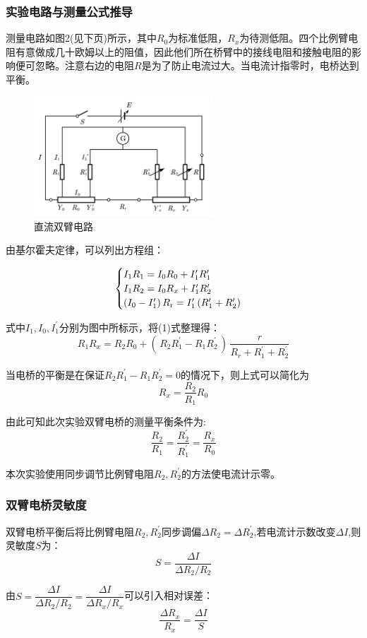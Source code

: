\documentclass[12pt,a4paper,UTF8]{ctexart}
\begin{document}
	\subsubsection*{实验电路与测量公式推导}
	\par 测量电路如图2(见下页)所示，其中$R_0$为标准低阻，$R_x$为待测低阻。四个比例臂电阻有意做成几十欧姆以上的阻值，因此他们所在桥臂中的接线电阻和接触电阻的影响便可忽略。注意右边的电阻$R$是为了防止电流过大。当电流计指零时，电桥达到平衡。
	\clearpage
	\begin{figure}
		\centering
		\includegraphics[width=0.6\textwidth]{直流双臂电路图透明}
		\caption{直流双臂电路}
	\end{figure}
	\par 由基尔霍夫定律，可以列出方程组：

	\begin{equation}
		\begin{cases}
			$$I_1 R_1=I_0 R_0+I_1^{\prime} R_1^{\prime} \\
			I_1 R_2=I_0 R_x+I_1^{\prime} R_2^{\prime} \\
			\left(I_0-I_1^{\prime}\right) R_{\mathrm{r}}=I_1^{\prime}\left(R_1^{\prime}+R_2^{\prime}\right)$$
		\end{cases}
	\end{equation}
	\par 式中$I_1,I_0,I_1^{\prime}$分别为图中所标示，将(1)式整理得：
	\[R_{1}R_{x}=R_{2}R_{0}+(\,R_{2}R_{1}^{\prime}-R_{1}R_{2}^{\prime}\,)\,{\frac{r}{R_{r}+R_{1}^{\prime}+R_{2}^{\prime}}}\]
	\par 当电桥的平衡是在保证$R_{2}R_{1}^{\prime}-R_{1}R_{2}^{\prime}=0$的情况下，则上式可以简化为
	\[R_{x}={\frac{R_{2}}{R_{1}}}R_{0}\]
	\par 由此可知此次实验双臂电桥的测量平衡条件为:
	\[{\frac{R_{2}}{{R_{1}}}}={\frac{{R_{2}^{\prime}}}{{R_{1}^{\prime}}}}={\frac{{R_{x}}}{{R_{0}}}}\]
	\par 本次实验使用同步调节比例臂电阻$R_2,R_2^{\prime}$的方法使电流计示零。
	\subsubsection*{双臂电桥灵敏度}
	\par 双臂电桥平衡后将比例臂电阻$R_2,R_2^{\prime}$同步调偏$\Delta R_2=\Delta R_2^{\prime}$,若电流计示数改变$\Delta I$,则灵敏度$S$为：
	\[
	S=\frac{\Delta I}{\Delta R_2 / R_2}
	\]
	\clearpage
	\par 由$S={\dfrac{\Delta I}{\Delta R_{2}/R_{2}}}={\dfrac{\Delta I}{\Delta R_{x}/R_{x}}}$可以引入相对误差：
	$${\frac{\Delta R_{x}}{R_{x}}}={\frac{\Delta I}{S}}$$
\end{document}
